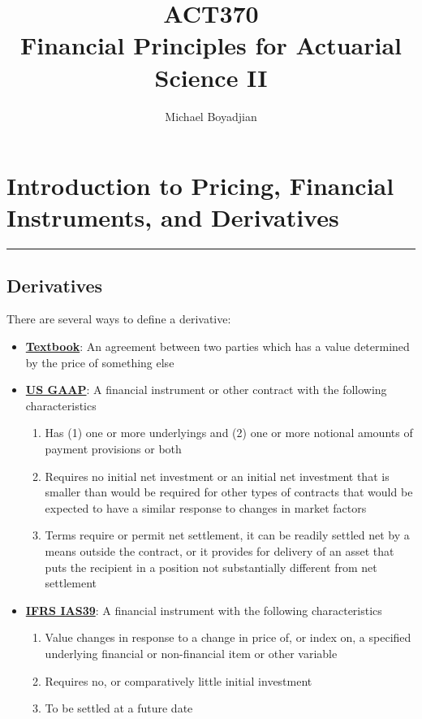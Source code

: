 \documentclass[11pt]{article}
\begin{document}
\title{ACT370  \\ Financial Principles for Actuarial Science II}
\author{Michael Boyadjian}
\maketitle
\pagebreak

\tableofcontents

\pagebreak

\bigskip
\bigskip
\bigskip


\section{Introduction to Pricing, Financial Instruments, and Derivatives}
\hrule \vspace{15pt}
\subsection{Derivatives}
There are several ways to define a derivative:
\begin{itemize}
\item \underline{\textbf{Textbook}}: An agreement between two parties which has a value determined by the price of something else
\item \underline{\textbf{US GAAP}}: A financial instrument or other contract with the following characteristics 
\begin{enumerate}
\item Has (1) one or more underlyings and (2) one or more notional amounts of payment provisions or both
\item Requires no initial net investment or an initial net investment that is smaller than would be required for other types of contracts that would be expected to have a similar response to changes in market factors
\item Terms require or permit net settlement, it can be readily settled net by a means outside the contract, or it provides for delivery of an asset that puts the recipient in a position not substantially different from net settlement
\end{enumerate}
\item \underline{\textbf{IFRS IAS39}}:  A financial instrument with the following characteristics 
\begin{enumerate}
\item Value changes in response to a change in price of, or index on,  a specified underlying financial or non-financial item or other variable
\item Requires no, or comparatively little initial investment
\item To be settled at a future date
\end{enumerate}
\end{itemize}
\end{document}
